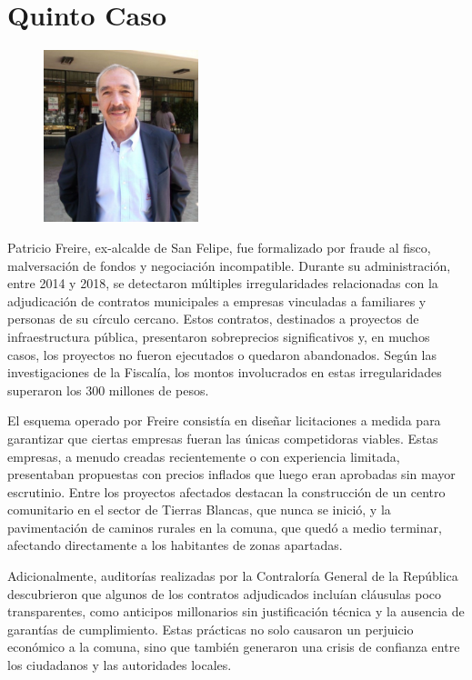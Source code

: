 \documentclass[letter,12pt]{article}
\begin{document}
	\section{Quinto Caso}
	\begin{figure}
		\centering
		\includegraphics[width=0.4\textwidth]{figures/freire}
	\end{figure}
	Patricio Freire, ex-alcalde de San Felipe, fue formalizado por fraude al fisco, malversación de fondos y negociación incompatible. Durante su administración, entre 2014 y 2018, se detectaron múltiples irregularidades relacionadas con la adjudicación de contratos municipales a empresas vinculadas a familiares y personas de su círculo cercano. Estos contratos, destinados a proyectos de infraestructura pública, presentaron sobreprecios significativos y, en muchos casos, los proyectos no fueron ejecutados o quedaron abandonados. Según las investigaciones de la Fiscalía, los montos involucrados en estas irregularidades superaron los 300 millones de pesos.
	
	El esquema operado por Freire consistía en diseñar licitaciones a medida para garantizar que ciertas empresas fueran las únicas competidoras viables. Estas empresas, a menudo creadas recientemente o con experiencia limitada, presentaban propuestas con precios inflados que luego eran aprobadas sin mayor escrutinio. Entre los proyectos afectados destacan la construcción de un centro comunitario en el sector de Tierras Blancas, que nunca se inició, y la pavimentación de caminos rurales en la comuna, que quedó a medio terminar, afectando directamente a los habitantes de zonas apartadas.
	
	Adicionalmente, auditorías realizadas por la Contraloría General de la República descubrieron que algunos de los contratos adjudicados incluían cláusulas poco transparentes, como anticipos millonarios sin justificación técnica y la ausencia de garantías de cumplimiento. Estas prácticas no solo causaron un perjuicio económico a la comuna, sino que también generaron una crisis de confianza entre los ciudadanos y las autoridades locales.\cite{freire}
	
\end{document}
